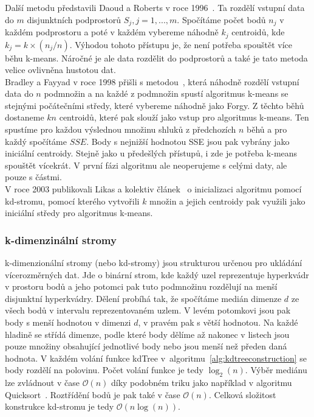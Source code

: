 Další metodu představili Daoud a Roberts v roce 1996~\cite{daoud96}. Ta rozdělí vstupní data do $m$ disjunktních podprostorů $S_j, j = 1,...,m$. Spočítáme počet bodů $n_j$ v každém podprostoru a poté v každém vybereme náhodně $k_j$ centroidů, kde $k_j = k \times (n_j/n)$. Výhodou tohoto přístupu je, že není potřeba spouštět více běhu k-means. Náročné je ale data rozdělit do podprostorů a také je tato metoda velice ovlivněna hustotou dat.\\

Bradley a Fayyad v roce 1998 přišli s metodou~\cite{bradley98}, která náhodně rozdělí vstupní data do $n$ podmnožin a na každé z podmnožin spustí algoritmus \mbox{k-means} se stejnými počátečními středy, které vybereme náhodně jako Forgy. Z těchto běhů dostaneme $kn$ centroidů, které pak slouží jako vstup pro algoritmus k-means. Ten spustíme pro každou výslednou množinu shluků z předchozích $n$ běhů a pro každý spočítáme $SSE$. Body s nejnižší hodnotou SSE jsou pak vybrány jako iniciální centroidy. Stejně jako u předešlých přístupů, i zde je potřeba k-means spouštět vícekrát. V první fázi algoritmu ale neoperujeme s celými daty, ale pouze s částmi.\\

V roce 2003 publikovali Likas a kolektiv článek~\cite{likas03} o inicializaci algoritmu pomocí \mbox{kd-stromu}, pomocí kterého vytvořili $k$ množin a jejich centroidy pak využili jako iniciální středy pro algoritmus k-means.

\subsubsection{k-dimenzinální stromy}\label{sssec:kdtrees}
k-dimenzionální stromy (nebo kd-stromy) jsou strukturou určenou pro ukládání vícerozměrných dat. Jde o binární strom, kde každý uzel reprezentuje hyperkvádr v prostoru bodů a jeho potomci pak tuto podmnožinu rozdělují na menší disjunktní hyperkvádry. Dělení probíhá tak, že spočítáme medián dimenze $d$ ze všech bodů v intervalu reprezentovaném uzlem. V levém potomkovi jsou pak body s menší hodnotou v dimenzi $d$, v pravém pak s větší hodnotou. Na každé hladině se střídá dimenze, podle které body dělíme až nakonec v listech jsou pouze množiny obsahující jednotlivé body nebo jsou menší než předen daná hodnota. V každém volání funkce kdTree v~algoritmu~\ref{alg:kdtreeconstruction} se body rozdělí na polovinu. Počet volání funkce je tedy $\log_2(n)$. Výběr mediánu lze zvládnout v čase $\mathcal{O}(n)$ díky podobném triku jako například v algoritmu Quicksort~\cite{Cormen07}. Roztřídění bodů je pak také v čase $\mathcal{O}(n)$. Celková složitost konstrukce kd-stromu je tedy $\mathcal{O}(n \log(n))$.

